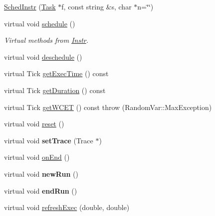 \begin{DoxyCompactItemize}
\item 
\hyperlink{classRTSim_1_1SchedInstr_ab12a273a1a2d654dd7ae96648844a514}{Sched\+Instr} (\hyperlink{classRTSim_1_1Task}{Task} $\ast$f, const string \&s, char $\ast$n=\char`\"{}\char`\"{})
\item 
virtual void \hyperlink{classRTSim_1_1SchedInstr_a85b99b66167703c31c640fd9de989511}{schedule} ()\hypertarget{classRTSim_1_1SchedInstr_a85b99b66167703c31c640fd9de989511}{}\label{classRTSim_1_1SchedInstr_a85b99b66167703c31c640fd9de989511}

\begin{DoxyCompactList}\small\item\em Virtual methods from \hyperlink{classRTSim_1_1Instr}{Instr}. \end{DoxyCompactList}\item 
virtual void \hyperlink{classRTSim_1_1SchedInstr_acdc1bcfd6d73d6d068d82e1767448c76}{deschedule} ()
\item 
virtual Tick \hyperlink{classRTSim_1_1SchedInstr_a2a989587281682f4c61685cb3d4eaf52}{get\+Exec\+Time} () const 
\item 
virtual Tick \hyperlink{classRTSim_1_1SchedInstr_ace2b9938db30911c2f14181942fcacc8}{get\+Duration} () const 
\item 
virtual Tick \hyperlink{classRTSim_1_1SchedInstr_a610b5dc3e4611e0e4d8a42c84b6dcc7f}{get\+W\+C\+ET} () const   throw (\+Random\+Var\+::\+Max\+Exception)
\item 
virtual void \hyperlink{classRTSim_1_1SchedInstr_a7fc472cc708642c97a2e855aebf6aef1}{reset} ()
\item 
virtual void {\bfseries set\+Trace} (Trace $\ast$)\hypertarget{classRTSim_1_1SchedInstr_a93867435d325338fa9eeccc9e546dc3e}{}\label{classRTSim_1_1SchedInstr_a93867435d325338fa9eeccc9e546dc3e}

\item 
virtual void \hyperlink{classRTSim_1_1SchedInstr_ac77197afccbfc7238d3945d1ba04ecfc}{on\+End} ()
\item 
virtual void {\bfseries new\+Run} ()\hypertarget{classRTSim_1_1SchedInstr_aaeefcd8bea84fc8b60768127a4d21b38}{}\label{classRTSim_1_1SchedInstr_aaeefcd8bea84fc8b60768127a4d21b38}

\item 
virtual void {\bfseries end\+Run} ()\hypertarget{classRTSim_1_1SchedInstr_a2d2fc07925740257760a1bc1f90ab94a}{}\label{classRTSim_1_1SchedInstr_a2d2fc07925740257760a1bc1f90ab94a}

\item 
virtual void \hyperlink{classRTSim_1_1SchedInstr_a0cfd007b2be8a9dcdd5c96a0cc41439e}{refresh\+Exec} (double, double)
\end{DoxyCompactItemize}
